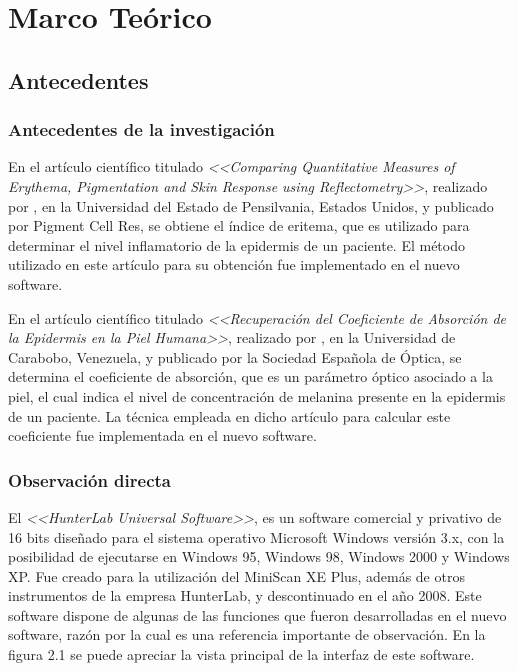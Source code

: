 \chapter{Marco Te\'{o}rico}

	\section{Antecedentes}
	
		\subsection{Antecedentes de la investigaci\'{o}n}
			
			En el art\'{i}culo cient\'{i}fico titulado \textit{<<Comparing Quantitative Measures of Erythema, Pigmentation and Skin Response using Reflectometry>>}, realizado por \cite{Wagner}, en la Universidad del Estado de Pensilvania, Estados Unidos, y publicado por Pigment Cell Res, se obtiene el \'{i}ndice de eritema, que es utilizado para determinar el nivel inflamatorio de la epidermis de un paciente. El m\'{e}todo utilizado en este art\'{i}culo para su obtenci\'{o}n fue implementado en el nuevo software.
			
			En el art\'{i}culo cient\'{i}fico titulado \textit{<<Recuperaci\'{o}n del Coeficiente de Absorci\'{o}n de la Epidermis en la Piel Humana>>}, realizado por \cite{Narea}, en la Universidad de Carabobo, Venezuela, y publicado por la Sociedad Espa\~{n}ola de \'{O}ptica, se determina el coeficiente de absorci\'{o}n, que es un par\'{a}metro \'{o}ptico asociado a la piel, el cual indica el nivel de concentraci\'{o}n de melanina presente en la epidermis de un paciente. La t\'{e}cnica empleada en dicho art\'{i}culo para calcular este coeficiente fue implementada en el nuevo software.

	\subsection{Observaci\'{o}n directa}
		
			El \textit{<<HunterLab Universal Software>>}, es un software comercial y privativo de 16 bits dise\~{n}ado para el sistema operativo Microsoft Windows versi\'{o}n 3.x, con la posibilidad de ejecutarse en Windows 95, Windows 98, Windows 2000 y Windows XP. Fue creado para la utilizaci\'{o}n del MiniScan XE Plus, adem\'{a}s de otros instrumentos de la empresa HunterLab, y descontinuado en el a\~{n}o 2008. Este software dispone de algunas de las funciones que fueron desarrolladas en el nuevo software, raz\'{o}n por la cual es una referencia importante de observaci\'{o}n. En la figura 2.1 se puede apreciar la vista principal de la interfaz de este software.
			

